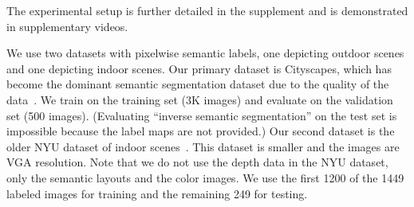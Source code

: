 The experimental setup is further detailed in the supplement and is demonstrated in supplementary videos.

We use two datasets with pixelwise semantic labels, one depicting outdoor scenes and one depicting indoor scenes. Our primary dataset is Cityscapes, which has become the dominant semantic segmentation dataset due to the quality of the data~\cite{Cordts2016}. We train on the training set (3K images) and evaluate on the validation set (500 images). (Evaluating ``inverse semantic segmentation'' on the test set is impossible because the label maps are not provided.)
Our second dataset is the older NYU dataset of indoor scenes~\cite{Silberman2012}. This dataset is smaller and the images are VGA resolution.
Note that we do not use the depth data in the NYU dataset, only the semantic layouts and the color images. We use the first 1200 of the 1449 labeled images for training and the remaining 249 for testing.



